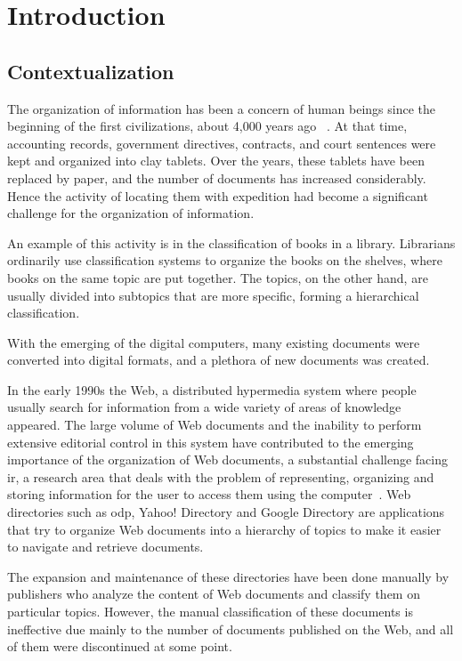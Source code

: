 \chapter{\hspace*{3pt} Introduction}
\label{chapter:intro}
\section{\hspace*{3pt}Contextualization}

The organization of information has been a concern of human beings since the beginning of the first civilizations, about 4,000 years ago ~\cite{baeza1999modern}. At that time, accounting records, government directives, contracts, and court sentences were kept and organized into clay tablets. Over the years, these tablets have been replaced by paper, and the number of documents has increased considerably. Hence the activity of locating them with expedition had become a significant challenge for the organization of information.

An example of this activity is in the classification of books in a library. Librarians ordinarily use classification systems to organize the books on the shelves, where books on the same topic are put together. The topics, on the other hand, are usually divided into subtopics that are more specific, forming a hierarchical classification. 

With the emerging of the digital computers, many existing documents were converted into digital formats, and a plethora of new documents was created.


In the early 1990s the Web, a distributed hypermedia system where people usually search for information from a wide variety of areas of knowledge appeared. The large volume of Web documents and the inability to perform extensive editorial control in this system have contributed to the emerging importance of the organization of Web documents, a substantial challenge facing  \gls{ir}, a research area that deals with the problem of representing, organizing and storing information for the user to access them using the computer~\cite{baeza1999modern}. Web directories such as \gls{odp}, Yahoo! Directory and Google Directory are applications that try to organize Web documents into a hierarchy of topics to make it easier to navigate and retrieve documents. 

The expansion and maintenance of these directories have been done manually by publishers who analyze the content of Web documents and classify them on particular topics. However, the manual classification of these documents is ineffective due mainly to the number of documents published on the Web, and all of them were discontinued at some point.

